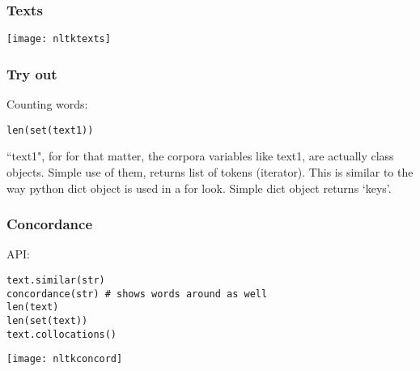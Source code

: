 \begin{frame}[fragile]\frametitle{Texts}
\begin{center}
\texttt{[image: nltktexts]}
\end{center}
\end{frame}




\begin{frame}[fragile]\frametitle{Try out}
Counting words:
      \begin{lstlisting}
len(set(text1))
  \end{lstlisting}
  
``text1", for for that matter, the corpora variables like text1, are actually class objects. Simple use of them, returns list of tokens (iterator). This is similar to the way python dict object is used in a for look. Simple dict object returns `keys'.

\end{frame}


\begin{frame}[fragile]\frametitle{Concordance}
API:
\begin{lstlisting}
text.similar(str)
concordance(str) # shows words around as well
len(text)
len(set(text))
text.collocations()
\end{lstlisting}
  
\begin{center}
\texttt{[image: nltkconcord]}
\end{center}
\end{frame}

